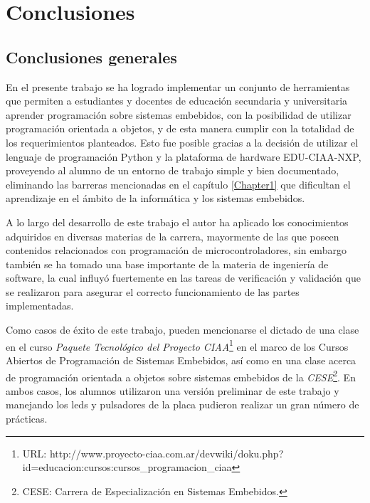 
\chapter{Conclusiones} %

\label{Chapter5} %




\section{Conclusiones generales }

En el presente trabajo se ha logrado implementar un conjunto de herramientas que permiten a estudiantes y docentes de educación secundaria y universitaria aprender programación sobre sistemas embebidos, con la posibilidad de utilizar programación orientada a objetos, y de esta manera cumplir con la totalidad de los requerimientos planteados. Esto fue posible gracias a la decisión de utilizar el lenguaje de programación Python y la plataforma de hardware EDU-CIAA-NXP, proveyendo al alumno de un entorno de trabajo simple y bien documentado, eliminando las barreras mencionadas en el capítulo \ref{Chapter1} que dificultan el aprendizaje en el ámbito de la informática y los sistemas embebidos.

A lo largo del desarrollo de este trabajo el autor ha aplicado los conocimientos adquiridos en diversas materias de la carrera, mayormente de las que poseen contenidos relacionados con programación de microcontroladores, sin embargo también se ha tomado una base importante de la materia de ingeniería de software, la cual influyó fuertemente en las tareas de verificación y validación que se realizaron para asegurar el correcto funcionamiento de las partes implementadas.

Como casos de éxito de este trabajo, pueden mencionarse el dictado de una clase en el curso \textit{Paquete Tecnológico del Proyecto CIAA}\footnote{URL: http://www.proyecto-ciaa.com.ar/devwiki/doku.php?id=educacion:cursos:cursos\_programacion\_ciaa} en el marco de los Cursos Abiertos de Programación de Sistemas Embebidos, así como en una clase acerca de programación orientada a objetos sobre sistemas embebidos de la \textit{CESE}\footnote{CESE: Carrera de Especialización en Sistemas Embebidos.}. En ambos casos, los alumnos utilizaron una versión preliminar de este trabajo y manejando los leds y pulsadores de la placa pudieron realizar un gran número de prácticas.


